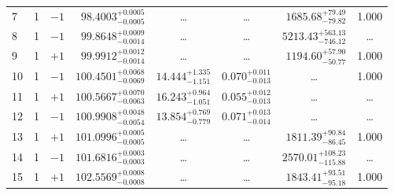 \begin{table*}[!]
\begin{tabular}{llcrrlrc}
7 & 1 & $-1$ & $     98.4003_{-      0.0005}^{+      0.0005}$ & \multicolumn{1}{c}{\dots} & \multicolumn{1}{c}{\dots} & $     1685.68_{-       79.82}^{+       79.49}$ & 1.000\\[1pt]
8 & 1 & $-1$ & $     99.8648_{-      0.0014}^{+      0.0009}$ & \multicolumn{1}{c}{\dots} & \multicolumn{1}{c}{\dots} & $     5213.43_{-      746.12}^{+      563.13}$ & \dots \\[1pt]
9 & 1 & $+1$ & $     99.9912_{-      0.0014}^{+      0.0012}$ & \multicolumn{1}{c}{\dots} & \multicolumn{1}{c}{\dots} & $     1194.60_{-       50.77}^{+       57.90}$ & 1.000\\[1pt]
10 & 1 & $-1$ & $    100.4501_{-      0.0069}^{+      0.0068}$ & $      14.444_{-       1.151}^{+       1.335}$ & $       0.070_{-       0.013}^{+       0.011}$ & \multicolumn{1}{c}{\dots} & 1.000\\[1pt]
11 & 1 & $+1$ & $    100.5667_{-      0.0063}^{+      0.0070}$ & $      16.243_{-       1.051}^{+       0.964}$ & $       0.055_{-       0.013}^{+       0.012}$ & \multicolumn{1}{c}{\dots} & \dots \\[1pt]
12 & 1 & $-1$ & $    100.9908_{-      0.0054}^{+      0.0048}$ & $      13.854_{-       0.779}^{+       0.769}$ & $       0.071_{-       0.014}^{+       0.013}$ & \multicolumn{1}{c}{\dots} & \dots \\[1pt]
13 & 1 & $+1$ & $    101.0996_{-      0.0005}^{+      0.0005}$ & \multicolumn{1}{c}{\dots} & \multicolumn{1}{c}{\dots} & $     1811.39_{-       86.45}^{+       90.84}$ & 1.000\\[1pt]
14 & 1 & $-1$ & $    101.6816_{-      0.0003}^{+      0.0003}$ & \multicolumn{1}{c}{\dots} & \multicolumn{1}{c}{\dots} & $     2570.01_{-      115.88}^{+      108.23}$ & \dots \\[1pt]
15 & 1 & $+1$ & $    102.5569_{-      0.0008}^{+      0.0008}$ & \multicolumn{1}{c}{\dots} & \multicolumn{1}{c}{\dots} & $     1843.41_{-       95.18}^{+       93.51}$ & 1.000\\[1pt]


\end{tabular}
\end{table*}
